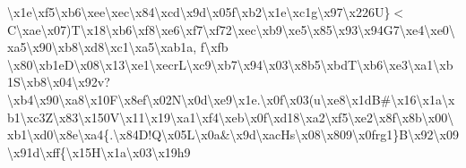 \textbackslash{}x1e\textbackslash{}xf5\textbackslash{}xb6\textbackslash{}xee\textbackslash{}xec\textbackslash{}x84\textbackslash{}xcd\textbackslash{}x9d\textbackslash{}x05f\textbackslash{}xb2\textbackslash{}x1e\textbackslash{}xc1g\textbackslash{}x97\textbackslash{}x226\+U\}$<$\+C\textbackslash{}xae\textbackslash{}x07)\+T\textbackslash{}x18\textbackslash{}xb6\textbackslash{}xf8\textbackslash{}xe6\textbackslash{}xf7\textbackslash{}xf72\textbackslash{}xec\textbackslash{}xb9\textbackslash{}xe5\textbackslash{}x85\textbackslash{}x93\textbackslash{}x94\+G7\textbackslash{}xe4\textbackslash{}xe0\textbackslash{}xa5\textbackslash{}x90\textbackslash{}xb8\textbackslash{}xd8\textbackslash{}xc1\textbackslash{}xa5\textbackslash{}xab1a, f\textbackslash{}xfb \textbackslash{}x80\textbackslash{}xb1e\+D\textbackslash{}x08\textbackslash{}x13\textbackslash{}xe1\textbackslash{}xecr\+L\textbackslash{}xc9\textbackslash{}xb7\textbackslash{}x94\textbackslash{}x03\textbackslash{}x8b5\textbackslash{}xbd\+T\textbackslash{}xb6\textbackslash{}xe3\textbackslash{}xa1\textbackslash{}xb1\+S\textbackslash{}xb8\textbackslash{}x04\textbackslash{}x92v?\textbackslash{}xb4\textbackslash{}x90\textbackslash{}xa8\textbackslash{}x10\+F\textbackslash{}x8ef\textbackslash{}x02\+N\textbackslash{}x0d\textbackslash{}xe9\textbackslash{}x1e.\textbackslash{}x0f\textbackslash{}x03(u\textbackslash{}xe8\textbackslash{}x1d\+B\#\textbackslash{}x16\textbackslash{}x1a\textbackslash{}xb1\textbackslash{}xc3\+Z\textbackslash{}x83\textbackslash{}x150\+V\textbackslash{}x11\textbackslash{}x19\textbackslash{}xa1\textbackslash{}xf4\textbackslash{}xeb\textbackslash{}x0f\textbackslash{}xd18\textbackslash{}xa2\textbackslash{}xf5\textbackslash{}xe2\textbackslash{}x8f\textbackslash{}x8b\textbackslash{}x00\textbackslash{}xb1\textbackslash{}xd0\textbackslash{}x8e\textbackslash{}xa4\{.\textbackslash{}x84\+D!\+Q\textbackslash{}x05\+L\textbackslash{}x0a\&\textbackslash{}x9d\textbackslash{}xac\+Hs\textbackslash{}x08\textbackslash{}x809\textbackslash{}x0frg1\}\+B\textbackslash{}x92\textbackslash{}x09\textbackslash{}x91d\textbackslash{}xff\{\textbackslash{}x15\+H\textbackslash{}x1a\textbackslash{}x03\textbackslash{}x19h9 